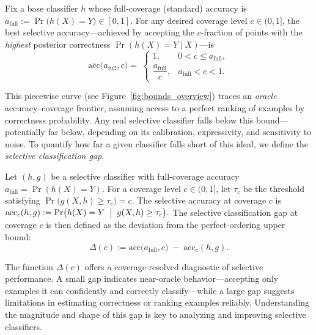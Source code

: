 \begin{definition}
\label{def:poub}
Fix a base classifier \(h\) whose full‑coverage (standard) accuracy is
\(a_{\text{full}}:=\Pr\bigl(h(X)=Y\bigr)\in[0,1]\).
For any desired coverage level \(c\in(0,1]\), the best selective
accuracy—achieved by accepting the \(c\)-fraction of points with the \emph{highest}
posterior correctness $\Pr(h(X)=Y\mid X)$—is
\begin{equation}
\label{eq:bound}
\overline{\mathrm{acc}}\bigl(a_{\text{full}},c\bigr)
=\;
\begin{cases}
1, & 0 < c \le a_{\text{full}}, \\[6pt]
\dfrac{a_{\text{full}}}{c}, & a_{\text{full}} < c < 1.
\end{cases}
\end{equation}
\end{definition}

This piecewise curve (see Figure~\ref{fig:bounds_overview}) traces an \emph{oracle} accuracy–coverage frontier, assuming access to a perfect ranking of examples by correctness probability. Any real selective classifier falls below this bound—potentially far below, depending on its calibration, expressivity, and sensitivity to noise. To quantify how far a given classifier falls short of this ideal, we define the \emph{selective classification gap}.

\begin{definition}
\label{def:gap}
Let \((h,g)\) be a selective classifier with full‑coverage accuracy 
\(a_{\mathrm{full}}=\Pr(h(X)=Y)\).  For a coverage level \(c\in(0,1]\), let
\(\tau_c\) be the threshold satisfying \(\Pr\bigl(g(X,h)\ge\tau_c\bigr)=c\).  The selective accuracy at coverage \(c\) is
\(
\mathrm{acc}_c(h,g)
:=
\Pr\bigl(h(X)=Y \;\bigm|\; g(X,h)\ge\tau_c\bigr).
\)
The selective classification gap at coverage \(c\) is then defined as the deviation from the perfect-ordering upper bound:
\begin{equation}
\Delta(c)
:=
\overline{\mathrm{acc}}\bigl(a_{\mathrm{full}},c\bigr)
\;-\;\mathrm{acc}_c(h,g).
\end{equation}
\end{definition}

The function \(\Delta(c)\) offers a coverage-resolved diagnostic of selective performance. A small gap indicates near-oracle behavior—accepting only examples it can confidently and correctly classify—while a large gap suggests limitations in estimating correctness or ranking examples reliably. Understanding the magnitude and shape of this gap is key to analyzing and improving selective classifiers.

